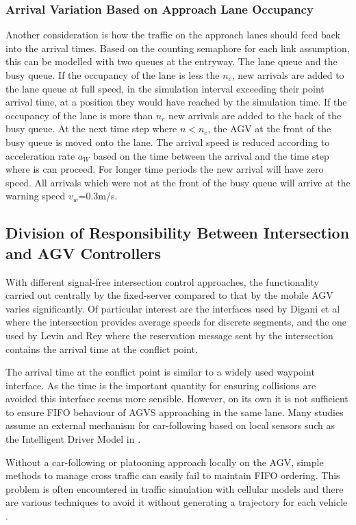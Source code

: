 \subsubsection{Arrival Variation Based on Approach Lane Occupancy}
Another consideration is how the traffic on the approach lanes should feed back into the arrival times. Based on the counting semaphore for each link assumption, this can be modelled with two queues at the entryway. The lane queue and the busy queue. If the occupancy of the lane is less the $n_c$, new arrivals are added to the lane queue at full speed, in the simulation interval exceeding their point arrival time, at a position they would have reached by the simulation time. If the occupancy of the lane is more than $n_c$ new arrivals are added to the back of the busy queue. At the next time step where $n<n_c$, the AGV at the front of the busy queue is moved onto the lane. The arrival speed is reduced according to acceleration rate $a_W$ based on the time between the arrival and the time step where is can proceed. For longer time periods the new arrival will have zero speed. All arrivals which were not at the front of the busy queue will arrive at the warning speed $v_w$=0.3m/s. 


\subsection{Division of Responsibility Between Intersection and AGV Controllers}
With different signal-free intersection control approaches, the functionality carried out centrally by the fixed-server compared to that by the mobile AGV varies significantly. Of particular interest are the interfaces used by Digani et al \cite{Digani2019} where the intersection provides average speeds for discrete segments, and the one used by Levin and Rey \cite{Levin2017} where the reservation message sent by the intersection contains the arrival time at the conflict point. 

The arrival time at the conflict point is similar to a widely used waypoint interface. As the time is the important quantity for ensuring collisions are avoided this interface seems more sensible. However, on its own it is not sufficient to ensure FIFO behaviour of AGVS approaching in the same lane. Many studies assume an external mechanism for car-following based on local sensors such as the Intelligent Driver Model in \cite{He2020}.  

Without a car-following or platooning approach locally on the AGV, simple methods to manage cross traffic can easily fail to maintain FIFO ordering. This problem is often encountered in traffic simulation with cellular models and there are various techniques to avoid it without generating a trajectory for each vehicle \cite{Carey2014}. 


